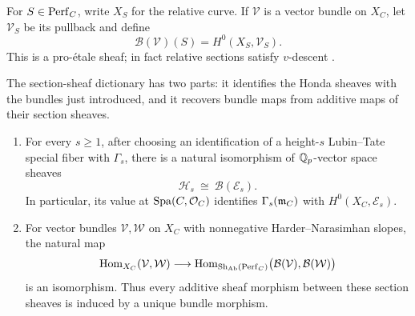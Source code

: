 For $S\in\operatorname{Perf}_C$, write $X_S$ for the relative curve.
If $\mathcal V$ is a vector bundle on $X_C$, let
$\mathcal V_S$ be its pullback and define
\[
  \mathcal B(\mathcal V)(S)=H^0(X_S,\mathcal V_S).
\]
This is a pro-\'etale sheaf; in fact relative sections satisfy
$v$-descent \cite[Proposition~II.2.1]{FS21}.

The section-sheaf dictionary has two parts: it identifies the Honda
sheaves with the bundles just introduced, and it recovers bundle maps
from additive maps of their section sheaves.

\begin{theorem}
\label{bundles:input}
\leavevmode
\begin{enumerate}
\item[\textup{(i)}]
For every $s\geq1$, after choosing an identification of a height-$s$
Lubin--Tate special fiber with $\Gamma_s$, there is a natural isomorphism of
$\mathbb Q_p$-vector space sheaves
\[
  \mathcal H_s\ \cong\ \mathcal B(\mathcal E_s).
\]
In particular, its value at $\operatorname{Spa}(C,\mathcal O_C)$ identifies
$\Gamma_s(\mathfrak m_C)$ with $H^0(X_C,\mathcal E_s)$.

\item[\textup{(ii)}]
For vector bundles $\mathcal V,\mathcal W$ on $X_C$ with nonnegative
Harder--Narasimhan slopes, the natural map
\[
  \operatorname{Hom}_{X_C}(\mathcal V,\mathcal W)
  \longrightarrow
  \operatorname{Hom}_{\operatorname{Sh}_{\mathrm{Ab}}(\operatorname{Perf}_C)}
       \bigl(\mathcal B(\mathcal V),\mathcal B(\mathcal W)\bigr)
\]
is an isomorphism.  Thus every additive sheaf morphism between these
section sheaves is induced by a unique bundle morphism.
\end{enumerate}
\end{theorem}

